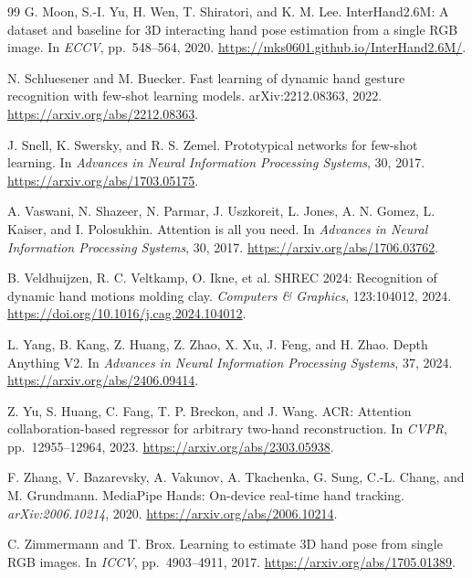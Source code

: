 \documentclass{article}
\begin{document}
\begin{thebibliography}{99}
G. Moon, S.-I. Yu, H. Wen, T. Shiratori, and K. M. Lee.
InterHand2.6M: A dataset and baseline for 3D interacting hand pose estimation from a single RGB image.
In \emph{ECCV}, pp.\ 548--564, 2020. \url{https://mks0601.github.io/InterHand2.6M/}.

N. Schluesener and M. Buecker.
Fast learning of dynamic hand gesture recognition with few-shot learning models.
arXiv:2212.08363, 2022. \url{https://arxiv.org/abs/2212.08363}.

J. Snell, K. Swersky, and R. S. Zemel.
Prototypical networks for few-shot learning.
In \emph{Advances in Neural Information Processing Systems}, 30, 2017.
\url{https://arxiv.org/abs/1703.05175}.

A. Vaswani, N. Shazeer, N. Parmar, J. Uszkoreit, L. Jones, A. N. Gomez,
L. Kaiser, and I. Polosukhin.
Attention is all you need.
In \emph{Advances in Neural Information Processing Systems}, 30, 2017.
\url{https://arxiv.org/abs/1706.03762}.

B. Veldhuijzen, R. C. Veltkamp, O. Ikne, et al.
SHREC 2024: Recognition of dynamic hand motions molding clay.
\emph{Computers \& Graphics}, 123:104012, 2024. \url{https://doi.org/10.1016/j.cag.2024.104012}.

L. Yang, B. Kang, Z. Huang, Z. Zhao, X. Xu, J. Feng, and H. Zhao.
Depth Anything V2.
In \emph{Advances in Neural Information Processing Systems}, 37, 2024. \url{https://arxiv.org/abs/2406.09414}.

Z. Yu, S. Huang, C. Fang, T. P. Breckon, and J. Wang.
ACR: Attention collaboration-based regressor for arbitrary two-hand reconstruction.
In \emph{CVPR}, pp.\ 12955--12964, 2023. \url{https://arxiv.org/abs/2303.05938}.

F. Zhang, V. Bazarevsky, A. Vakunov, A. Tkachenka, G. Sung,
C.-L. Chang, and M. Grundmann.
MediaPipe Hands: On-device real-time hand tracking.
\emph{arXiv:2006.10214}, 2020. \url{https://arxiv.org/abs/2006.10214}.

C. Zimmermann and T. Brox.
Learning to estimate 3D hand pose from single RGB images.
In \emph{ICCV}, pp.\ 4903--4911, 2017. \url{https://arxiv.org/abs/1705.01389}.
\end{thebibliography}
\end{document}
